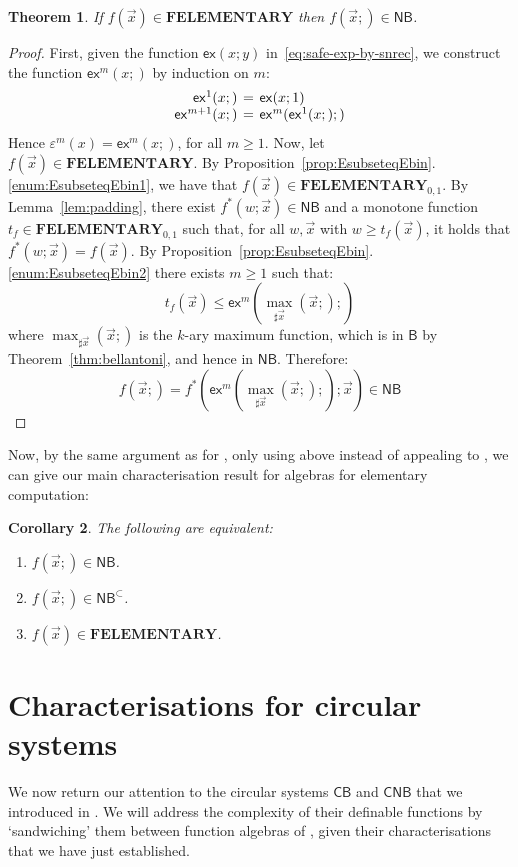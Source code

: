 \documentclass[manuscript,screen]{acmart}
\newtheorem{thm}{Theorem}
\newtheorem{cor}[thm]{Corollary}
\theoremstyle{definition}
\theoremstyle{remark}
\newcommand{\permpref}{\subset}
\newcommand{\elementary}{\mathbf{ELEMENTARY}}
\newcommand{\f}{\mathbf{F}}
\newcommand{\felementary}{\f\elementary}
\newcommand{\ex}{\mathsf{ex}}
\newcommand{\bc}{\mathsf{B}}
\newcommand{\bcwfpo}[1]{\bc^{#1}}
\newcommand{\nested}{\mathsf{N}}
\newcommand{\nbc}{\nested\bc}
\newcommand{\nbcwfpo}[1]{\nested\bcwfpo{#1}}
\newcommand{\nbcpp}{\nbcwfpo{\permpref}}
\newcommand{\cyclic}{\mathsf{C}}
\newcommand{\cbc}{\cyclic\bc}
\newcommand{\ncbc}{\cyclic\nested\bc}
\begin{document}
\begin{thm}
\label{thm:elementary-in-nbc}
If $f(\vec x) \in \felementary$ then $f(\vec x;) \in \nbc$.
\end{thm}
\begin{proof}
First, given the function $\ex(x; y)$ in~\eqref{eq:safe-exp-by-snrec}, we construct the function $\ex^m(x;)$ by induction on $m$:
\begin{equation*}
\arraycolsep=2pt
    \begin{array}{rcl}
     \ex^1(x;)&=& \ex(x;1)\\
       \ex^{m+1}(x;)&=&   \ex^{m}(  \ex^{1}(x;);)
    \end{array}
\end{equation*}
Hence  $\varepsilon^m(x)=\ex^m(x;)$, for all $m\geq 1$. Now, let $f(\vec x) \in \felementary$. By Proposition~\ref{prop:EsubseteqEbin}.\ref{enum:EsubseteqEbin1}, we have that $f(\vec x) \in \felementary_{0,1}$. By Lemma~\ref{lem:padding},   there exist $f^*(w; \vec x)\in\nbc$ and a monotone function $t_{f}\in \felementary_{0,1}$  such that, for all $w, \vec{x}$ with  $w \geq t_f(\vec{x})$, it holds that $f^*(w; \vec{x})= f(\vec{x})$. By Proposition~\ref{prop:EsubseteqEbin}.\ref{enum:EsubseteqEbin2}  there exists $m \geq 1$ such that:
\begin{equation*}
    t_f(\vec{x})\leq  \ex^{m}(\max_{\sharp \vec{x}}(\vec{x};);) 
\end{equation*}
where $\max_{\sharp \vec{x}}(\vec{x};)$ is the $k$-ary maximum function, which is in $\bc$ by Theorem~\ref{thm:bellantoni}, and hence in $\nbc$. Therefore:
\begin{equation*}
    f(\vec{x};)=f^*(\ex^{m}(\max_{\sharp \vec{x}}(\vec{x};););\vec{x})\in \nbc
\end{equation*}
\end{proof}

Now, by the same argument as for , only using  above instead of appealing to \cite{BellantoniCook}, we can give our main characterisation result for algebras for elementary computation:

\begin{cor}\label{cor:nb-elementary-characterization} The following are equivalent:
\begin{enumerate}
    \item\label{enum:elementary1} $f(\vec x;)\in \nbc$.
    \item \label{enum:elementary2}  $f(\vec x;)\in \nbcpp$. 
    \item \label{enum:elementary3}  $f(\vec x)\in \felementary$.
\end{enumerate}
\end{cor}  \section{Characterisations for circular systems}
\label{sec:completeness}
We now return our attention to the circular systems $\cbc$ and $\ncbc$ that we introduced in . 
We will address the complexity of their definable functions by `sandwiching' them between function algebras of , given their characterisations that we have just established.
\end{document}
